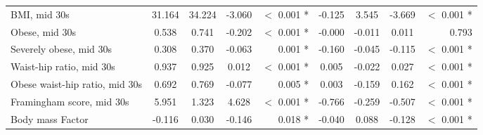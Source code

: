\begin{tabular}{l c c c r c c c r}
BMI, mid 30s & 31.164 & 34.224 & -3.060 & $ < $ 0.001 * & -0.125 & 3.545 & -3.669 & $ < $ 0.001 * \\
Obese, mid 30s & 0.538 & 0.741 & -0.202 & $ < $ 0.001 * & -0.000 & -0.011 & 0.011 & 0.793 \\
Severely obese, mid 30s & 0.308 & 0.370 & -0.063 & 0.001 * & -0.160 & -0.045 & -0.115 & $ < $ 0.001 * \\
Waist-hip ratio, mid 30s & 0.937 & 0.925 & 0.012 & $ < $ 0.001 * & 0.005 & -0.022 & 0.027 & $ < $ 0.001 * \\
Obese waist-hip ratio, mid 30s & 0.692 & 0.769 & -0.077 & 0.005 * & 0.003 & -0.159 & 0.162 & $ < $ 0.001 * \\
Framingham score, mid 30s & 5.951 & 1.323 & 4.628 & $ < $ 0.001 * & -0.766 & -0.259 & -0.507 & $ < $ 0.001 * \\
Body mass Factor & -0.116 & 0.030 & -0.146 & 0.018 * & -0.040 & 0.088 & -0.128 & $ < $ 0.001 * \\
\bottomrule
\end{tabular}
